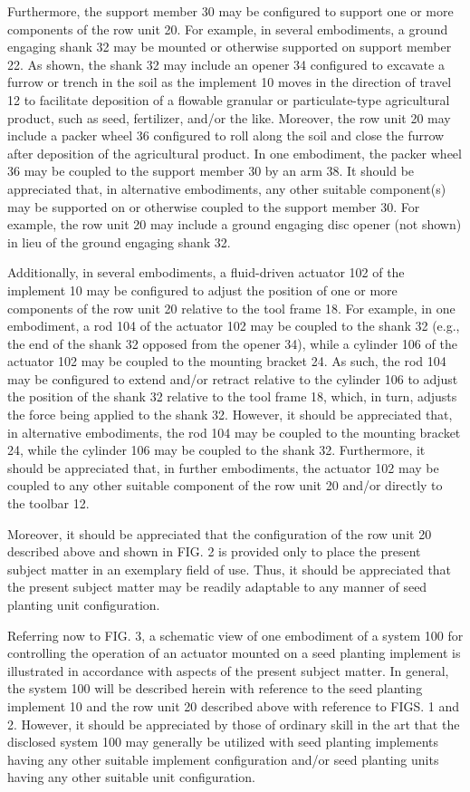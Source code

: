 \documentclass[11pt,a4paper]{article}
\begin{document}
Furthermore, the support member 30 may be configured to support one or more components of the row unit 20. For example, in several embodiments, a ground engaging shank 32 may be mounted or otherwise supported on support member 22. As shown, the shank 32 may include an opener 34 configured to excavate a furrow or trench in the soil as the implement 10 moves in the direction of travel 12 to facilitate deposition of a flowable granular or particulate-type agricultural product, such as seed, fertilizer, and/or the like. Moreover, the row unit 20 may include a packer wheel 36 configured to roll along the soil and close the furrow after deposition of the agricultural product. In one embodiment, the packer wheel 36 may be coupled to the support member 30 by an arm 38. It should be appreciated that, in alternative embodiments, any other suitable component(s) may be supported on or otherwise coupled to the support member 30. For example, the row unit 20 may include a ground engaging disc opener (not shown) in lieu of the ground engaging shank 32.

Additionally, in several embodiments, a fluid-driven actuator 102 of the implement 10 may be configured to adjust the position of one or more components of the row unit 20 relative to the tool frame 18. For example, in one embodiment, a rod 104 of the actuator 102 may be coupled to the shank 32 (e.g., the end of the shank 32 opposed from the opener 34), while a cylinder 106 of the actuator 102 may be coupled to the mounting bracket 24. As such, the rod 104 may be configured to extend and/or retract relative to the cylinder 106 to adjust the position of the shank 32 relative to the tool frame 18, which, in turn, adjusts the force being applied to the shank 32. However, it should be appreciated that, in alternative embodiments, the rod 104 may be coupled to the mounting bracket 24, while the cylinder 106 may be coupled to the shank 32. Furthermore, it should be appreciated that, in further embodiments, the actuator 102 may be coupled to any other suitable component of the row unit 20 and/or directly to the toolbar 12.

Moreover, it should be appreciated that the configuration of the row unit 20 described above and shown in FIG. 2 is provided only to place the present subject matter in an exemplary field of use. Thus, it should be appreciated that the present subject matter may be readily adaptable to any manner of seed planting unit configuration.

Referring now to FIG. 3, a schematic view of one embodiment of a system 100 for controlling the operation of an actuator mounted on a seed planting implement is illustrated in accordance with aspects of the present subject matter. In general, the system 100 will be described herein with reference to the seed planting implement 10 and the row unit 20 described above with reference to FIGS. 1 and 2. However, it should be appreciated by those of ordinary skill in the art that the disclosed system 100 may generally be utilized with seed planting implements having any other suitable implement configuration and/or seed planting units having any other suitable unit configuration.
\end{document}

